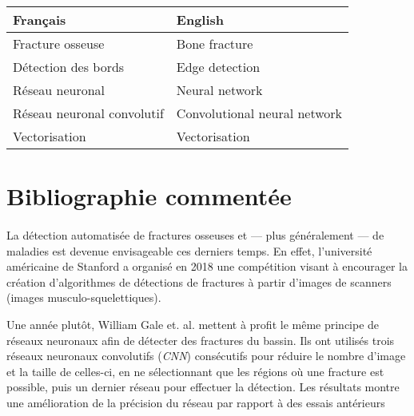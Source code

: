 \documentclass[a4paper]{article}
\begin{document}
\begin{table}[h]
    \centering
    \label{tab:keywords}
    \begin{tabular}{l|l}
    Français & English \\\hline
    Fracture osseuse & Bone fracture \\
    Détection des bords & Edge detection \\
    Réseau neuronal & Neural network \\
    Réseau neuronal convolutif & Convolutional neural network  \\
    Vectorisation & Vectorisation \\
    \end{tabular}
\end{table}

\section{Bibliographie commentée}

\paragraph{}

La détection automatisée de fractures osseuses et --- plus généralement --- de maladies est devenue envisageable ces
derniers temps. En effet, l'université américaine de Stanford a organisé en 2018 une compétition visant à encourager la
création d'algorithmes de détections de fractures à partir d'images de scanners (images musculo-squelettiques).

Une année plutôt, William Gale et. al. mettent à profit le même principe de réseaux neuronaux afin de détecter des
fractures du bassin\cite{detect-hip}.  Ils ont utilisés trois réseaux neuronaux convolutifs (\emph{CNN}) consécutifs
pour réduire le nombre d'image et la taille de celles-ci, en ne sélectionnant que les régions où une fracture est
possible, puis un dernier réseau pour effectuer la détection. Les résultats montre une amélioration de la précision du
réseau par rapport à des essais antérieurs

\paragraph{}
\end{document}
